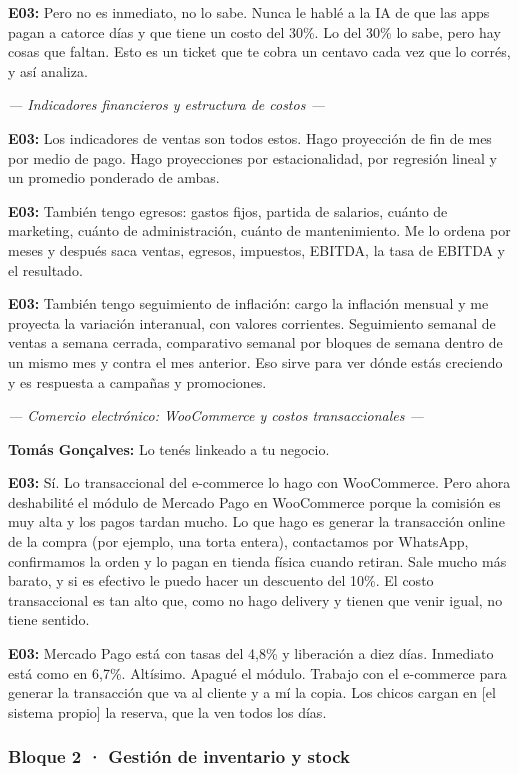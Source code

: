 \noindent\textbf{E03:} Pero no es inmediato, no lo sabe. Nunca le hablé a la IA de que las apps pagan a catorce días y que tiene un costo del 30\%. Lo del 30\% lo sabe, pero hay cosas que faltan. Esto es un ticket que te cobra un centavo cada vez que lo corrés, y así analiza.

\noindent\textit{--- Indicadores financieros y estructura de costos ---}

\noindent\textbf{E03:} Los indicadores de ventas son todos estos. Hago proyección de fin de mes por medio de pago. Hago proyecciones por estacionalidad, por regresión lineal y un promedio ponderado de ambas.

\noindent\textbf{E03:} También tengo egresos: gastos fijos, partida de salarios, cuánto de marketing, cuánto de administración, cuánto de mantenimiento. Me lo ordena por meses y después saca ventas, egresos, impuestos, EBITDA, la tasa de EBITDA y el resultado.

\noindent\textbf{E03:} También tengo seguimiento de inflación: cargo la inflación mensual y me proyecta la variación interanual, con valores corrientes. Seguimiento semanal de ventas a semana cerrada, comparativo semanal por bloques de semana dentro de un mismo mes y contra el mes anterior. Eso sirve para ver dónde estás creciendo y es respuesta a campañas y promociones.

\noindent\textit{--- Comercio electrónico: WooCommerce y costos transaccionales ---}

\noindent\textbf{Tomás Gonçalves:} Lo tenés linkeado a tu negocio.

\noindent\textbf{E03:} Sí. Lo transaccional del e-commerce lo hago con WooCommerce. Pero ahora deshabilité el módulo de Mercado Pago en WooCommerce porque la comisión es muy alta y los pagos tardan mucho. Lo que hago es generar la transacción online de la compra (por ejemplo, una torta entera), contactamos por WhatsApp, confirmamos la orden y lo pagan en tienda física cuando retiran. Sale mucho más barato, y si es efectivo le puedo hacer un descuento del 10\%. El costo transaccional es tan alto que, como no hago delivery y tienen que venir igual, no tiene sentido.

\noindent\textbf{E03:} Mercado Pago está con tasas del 4,8\% y liberación a diez días. Inmediato está como en 6,7\%. Altísimo. Apagué el módulo. Trabajo con el e-commerce para generar la transacción que va al cliente y a mí la copia. Los chicos cargan en [el sistema propio] la reserva, que la ven todos los días.

\subsubsection*{Bloque 2 · Gestión de inventario y stock}

